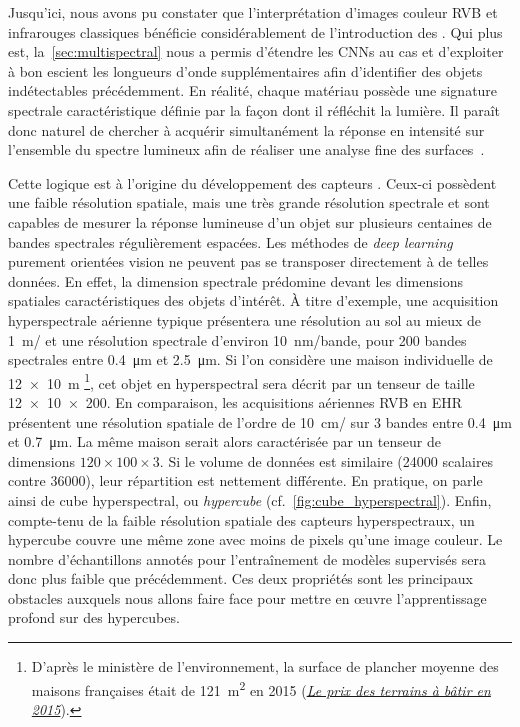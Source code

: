 Jusqu'ici, nous avons pu constater que l'interprétation d'images couleur \gls{RVB} et infrarouges classiques bénéficie considérablement de l'introduction des . Qui plus est, la~\cref{sec:multispectral} nous a permis d'étendre les \glspl{CNN} au cas  et d'exploiter à bon escient les longueurs d'onde supplémentaires afin d'identifier des objets indétectables précédemment. En réalité, chaque matériau possède une signature spectrale caractéristique définie par la façon dont il réfléchit la lumière. Il paraît donc naturel de chercher à acquérir simultanément la réponse en intensité sur l'ensemble du spectre lumineux afin de réaliser une analyse fine des surfaces~\cite{cubero-castan_physics-based_2015,fabre_estimation_2015}.

Cette logique est à l'origine du développement des capteurs . Ceux-ci possèdent une faible résolution spatiale, mais une très grande résolution spectrale et sont capables de mesurer la réponse lumineuse d'un objet sur plusieurs centaines de bandes spectrales régulièrement espacées. Les méthodes de \emph{deep learning} purement orientées vision ne peuvent pas se transposer directement à de telles données. En effet, la dimension spectrale prédomine devant les dimensions spatiales caractéristiques des objets d'intérêt. À titre d'exemple, une acquisition hyperspectrale aérienne typique présentera une résolution au sol au mieux de \SI{1}{\meter/\px} et une résolution spectrale d'environ \SI{10}{\nano\meter/bande}, pour 200 bandes spectrales entre \SI{0,4}{\micro\meter} et \SI{2,5}{\micro\meter}. Si l'on considère une maison individuelle de \SI{12x10}{\meter} \footnote{D'après le ministère de l'environnement, la surface de plancher moyenne des maisons françaises était de \SI{121}{\meter\squared} en 2015 (\href{http://www.cohesion-territoires.gouv.fr/IMG/pdf/datalab-essentiel-51-le-prix-des-terrains-a-batir-en-2015-oct2016.pdf}{\og \emph{Le prix des terrains à bâtir en 2015\fg}}).}, cet objet en hyperspectral sera décrit par un tenseur de taille \num{12x10x200}.
En comparaison, les acquisitions aériennes \gls{RVB} en \gls{EHR} présentent une résolution spatiale de l'ordre de \SI{10}{\centi\meter/\px} sur 3 bandes entre \SI{0,4}{\micro\meter} et \SI{0,7}{\micro\meter}. La même maison serait alors caractérisée par un tenseur de dimensions $120\times100\times3$. Si le volume de données est similaire (\num{24000} scalaires contre \num{36000}), leur répartition est nettement différente. En pratique, on parle ainsi de cube hyperspectral, ou \emph{hypercube} (cf.~\cref{fig:cube_hyperspectral}). Enfin, compte-tenu de la faible résolution spatiale des capteurs hyperspectraux, un hypercube couvre une même zone avec moins de pixels qu'une image couleur. Le nombre d'échantillons annotés pour l'entraînement de modèles supervisés sera donc plus faible que précédemment. Ces deux propriétés sont les principaux obstacles auxquels nous allons faire face pour mettre en \oe{}uvre l'apprentissage profond sur des hypercubes.

